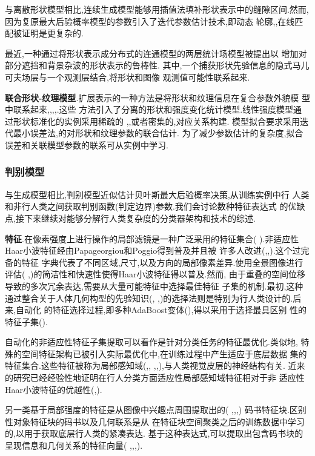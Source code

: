 \documentclass[10pt,letterpaper,journal,compsoc]{IEEEtran}
\begin{document}
与离散形状模型相比,连续生成模型能够用插值法填补形状表示中的缝隙区间.然而,
因为复原最大后验概率模型的参数引入了迭代参数估计技术,即动态
轮廓\cite{bib9},\cite{bib50},在线匹配被证明是更复杂的.

最近,一种通过将形状表示成分布式的连通模型的两层统计场模型\cite{bib77}被提出以
增加对部分遮挡和背景杂波的形状表示的鲁棒性.
其中,一个捕获形状先验信息的隐式马儿可夫场层与一个观测层结合,将形状和图像
观测值可能性联系起来.

\textbf{联合形状-纹理模型}.扩展表示的一种方法是将形状和纹理信息在复合参数外貌模
型中联系起来\cite{bib8},\cite{bib9},\cite{bib14},\cite{bib17},\cite{bib34}.这些
方法引入了分离的形状和强度变化统计模型.线性强度模型通过形状标准化的实例采用稀疏的
\cite{bib9},\cite{bib14},\cite{bib17}或者密集的\cite{bib8},\cite{bib34}对应关系构建.
模型拟合要求采用迭代最小误差法\cite{bib17},\cite{bib34}的对形状和纹理参数的联合估计.
为了减少参数估计的复杂度,拟合误差和关联模型参数的联系可从实例中学习\cite{bib9}.
\subsubsection{判别模型}
与生成模型相比,判别模型近似估计贝叶斯最大后验概率决策,从训练实例中行
人类和非行人类之间获取判别函数(判定边界)参数.我们会讨论数种特征表达式
的优缺点,接下来继续对能够分解行人类复杂度的分类器架构和技术的综述.

\textbf{特征}.在像素强度上进行操作的局部滤镜是一种广泛采用的特征集合(
\cite{bib59}).非适应性Haar小波特征经由Papageorgiou和Poggio得到普及并且被
许多人改进(\cite{bib48},\cite{bib64},\cite{bib74}).这个过完备的特征
字典代表了不同区域,尺寸,以及方向的局部像素差异.使用全景图像进行评估(
\cite{bib41},\cite{bib74})的简洁性和快速性使得Haar小波特征得以普及.然而,
由于重叠的空间位移导致的多次冗余表达,需要从大量可能特征中选择最佳特征
子集的机制.最初,这种通过整合关于人体几何构型的先验知识(\cite{bib48},
\cite{bib53},\cite{bib64})的选择法则是特别为行人类设计的.后来,自动化
的特征选择过程,即多种AdaBoost变体(\cite{bib18}),得以采用于选择最具区别
性的特征子集(\cite{bib74}).

自动化的非适应性特征子集提取可以看作是针对分类任务的特征最优化.类似地,
特殊的空间特征架构已被引入实际最优化中,在训练过程中产生适应于底层数据
集的特征集合.这些特征被称为局部感知域(\cite{bib19},\cite{bib23},
\cite{bib49},\cite{bib68},\cite{bib75}),与人类视觉皮层的神经结构有关.
近来的研究已经经验性地证明在行人分类方面适应性局部感知域特征相对于非
适应性Haar小波特征的优越性(\cite{bib49},\cite{bib68}).

另一类基于局部强度的特征是从图像中兴趣点周围提取出的(
\cite{bib1},\cite{bib39},\cite{bib40},\cite{bib61})
码书特征块.区别性对象特征块的码书以及几何联系是从
在特征块空间聚类之后的训练数据中学习的,以用于获取底层行人类的紧凑表达.
基于这种表达式,可以提取出包含码书块的呈现信息和几何关系的特征向量(
\cite{bib1},\cite{bib39},\cite{bib40},\cite{bib61}).
\end{document}

